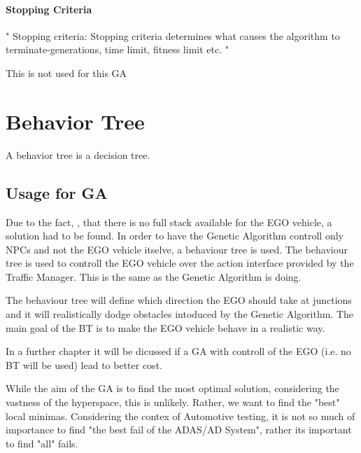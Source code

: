 \paragraph{Stopping Criteria}

"
Stopping criteria: Stopping criteria determines what causes the algorithm to terminate-generations, time limit, fitness limit etc.
"\cite{majumdar_genetic_2015}

This is not used for this GA


\section{Behavior Tree}
A behavior tree is a decision tree. 

\subsection{Usage for GA}
Due to the fact, , that there is no full stack available for the EGO vehicle, a solution had to be found.
In order to have the Genetic Algorithm controll only NPCs and not the EGO vehicle itselve, a behaviour tree is used.
The behaviour tree is used to controll the EGO vehicle over the action interface provided by the Traffic Manager. This is the same as the Genetic Algorithm is doing.

The behaviour tree will define which direction the EGO should take at junctions and it will realistically dodge obstacles intoduced by the Genetic Algorithm. The main goal of the BT is to make the EGO vehicle behave in a realistic way.

In a further chapter it will be dicussed if a GA with controll of the EGO (i.e. no BT will be used) lead to better cost.

While the aim of the GA is to find the most optimal solution, considering the vastness of the hyperspace, this is unlikely. Rather, we want to find the "best" local minimas. Considering the contex of Automotive testing, it is not so much of importance to find "the best fail of the ADAS/AD System", rather its important to find "all" fails.






